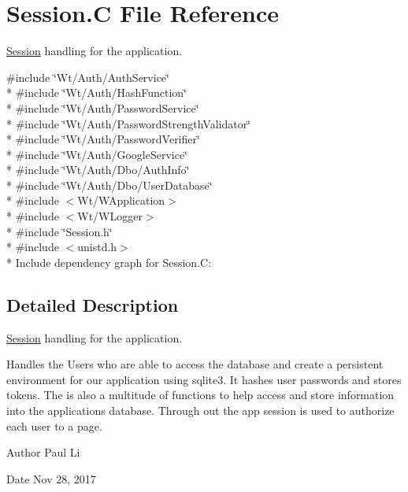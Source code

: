 \hypertarget{Session_8C}{}\section{Session.\+C File Reference}
\label{Session_8C}


\hyperlink{classSession}{Session} handling for the application.  


{\ttfamily \#include \char`\"{}Wt/\+Auth/\+Auth\+Service\char`\"{}}\\*
{\ttfamily \#include \char`\"{}Wt/\+Auth/\+Hash\+Function\char`\"{}}\\*
{\ttfamily \#include \char`\"{}Wt/\+Auth/\+Password\+Service\char`\"{}}\\*
{\ttfamily \#include \char`\"{}Wt/\+Auth/\+Password\+Strength\+Validator\char`\"{}}\\*
{\ttfamily \#include \char`\"{}Wt/\+Auth/\+Password\+Verifier\char`\"{}}\\*
{\ttfamily \#include \char`\"{}Wt/\+Auth/\+Google\+Service\char`\"{}}\\*
{\ttfamily \#include \char`\"{}Wt/\+Auth/\+Dbo/\+Auth\+Info\char`\"{}}\\*
{\ttfamily \#include \char`\"{}Wt/\+Auth/\+Dbo/\+User\+Database\char`\"{}}\\*
{\ttfamily \#include $<$Wt/\+W\+Application$>$}\\*
{\ttfamily \#include $<$Wt/\+W\+Logger$>$}\\*
{\ttfamily \#include \char`\"{}Session.\+h\char`\"{}}\\*
{\ttfamily \#include $<$unistd.\+h$>$}\\*
Include dependency graph for Session.\+C\+:


\subsection{Detailed Description}
\hyperlink{classSession}{Session} handling for the application. 

Handles the Users who are able to access the database and create a persistent environment for our application using sqlite3. It hashes user passwords and stores tokens. The is also a multitude of functions to help access and store information into the applications database. Through out the app session is used to authorize each user to a page.

\begin{DoxyAuthor}{Author}
Paul Li 
\end{DoxyAuthor}
\begin{DoxyDate}{Date}
Nov 28, 2017 
\end{DoxyDate}

